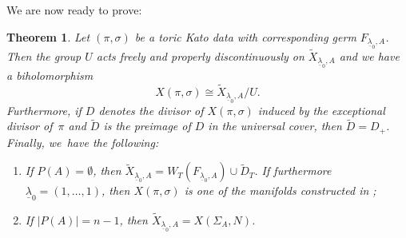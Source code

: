 \documentclass[JEP,XML,SOM,Unicode,NoFloatCountersInSection]{cedram}
\newenvironment{enumeratei}
{\bgroup\def\theenumi{\roman{enumi}}\def\theenumii{\arabic{enumii}}\begin{enumerate}}
{\end{enumerate}\egroup}
\newtheorem{theorem}{Theorem}[section]
\theoremstyle{definition}
\let\wt\widetilde
\let\la\lambda
\let\un\underline
\begin{document}
We are now ready to prove:

\begin{theorem}\label{secondDescr}
Let $(\pi,\sigma)$ be a toric Kato data with corresponding germ $F_{\un\la_0,A}$. Then the group $U$ acts freely and properly discontinuously on $\wt{X}_{\un\la_0,A}$ and we have a biholomorphism
\begin{equation*}
X(\pi,\sigma)\cong\wt{X}_{\un\la_0,A}/U.
\end{equation*}
Furthermore, if $D$ denotes the divisor of $X(\pi,\sigma)$ induced by the exceptional divisor of~$\pi$ and $\wt{D}$ is the preimage of $D$ in the universal cover, then $\wt{D}=D_+$. Finally, we~have the following:
\begin{enumeratei}
\item If $P(A)=\emptyset$, then $\wt{X}_{\un\la_0,A}=W_T(F_{\un\la_0,A})\cup \wt{D}_T$. If furthermore $\un\la_0=(1,\ldots, 1)$, then $X(\pi,\sigma)$ is one of the manifolds constructed in \cite{tsu};
\item If $|P(A)|=n-1$, then $\wt{X}_{\un\la_0,A}=X(\Sigma_A,N)$.
\end{enumeratei}
\end{theorem}
\end{document}
